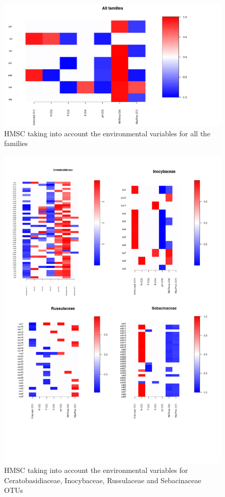 \begin{figure}[htbp]
\centering
\includegraphics[keepaspectratio,width=\textwidth,height=0.75\textheight]{images/envCorrLump.png}
\caption{HMSC taking into account the environmental variables for all the families}
\end{figure}

\begin{figure}[htbp]
\centering
\includegraphics[keepaspectratio,width=\textwidth,height=0.75\textheight]{images/hmsc01.png}
\caption{HMSC taking into account the environmental variables for Ceratobasidiaceae, Inocybaceae, Russulaceae and Sebacinaceae OTUs}
\end{figure}

